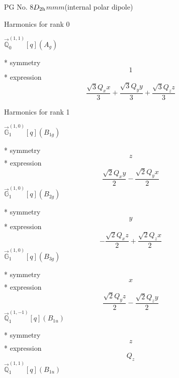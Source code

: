 \documentclass[fleqn,8pt]{jsarticle}
\begin{document}
\setcounter{MaxMatrixCols}{32}

\renewcommand{\tablename}{Table~}
\renewcommand{\figurename}{Figure~}
\begin{center}
\LARGE
PG No. 8\quad$D_{\rm 2h}$\quad$mmm$\quad[ orthorhombic ] (internal polar dipole)
\end{center}

\noindent * Harmonics for rank 0

\noindent\quad $\vec{\mathbb{Q}}_{0}^{(1,1)}[q](A_{g})$

\noindent\quad ** symmetry
\begin{dmath*}
1
\end{dmath*}
\noindent\quad ** expression
\begin{dmath*}
\frac{\sqrt{3} Q_{x} x}{3} + \frac{\sqrt{3} Q_{y} y}{3} + \frac{\sqrt{3} Q_{z} z}{3}
\end{dmath*}

\noindent * Harmonics for rank 1

\noindent\quad $\vec{\mathbb{G}}_{1}^{(1,0)}[q](B_{1g})$

\noindent\quad ** symmetry
\begin{dmath*}
z
\end{dmath*}
\noindent\quad ** expression
\begin{dmath*}
\frac{\sqrt{2} Q_{x} y}{2} - \frac{\sqrt{2} Q_{y} x}{2}
\end{dmath*}
\noindent\quad $\vec{\mathbb{G}}_{1}^{(1,0)}[q](B_{2g})$

\noindent\quad ** symmetry
\begin{dmath*}
y
\end{dmath*}
\noindent\quad ** expression
\begin{dmath*}
- \frac{\sqrt{2} Q_{x} z}{2} + \frac{\sqrt{2} Q_{z} x}{2}
\end{dmath*}
\noindent\quad $\vec{\mathbb{G}}_{1}^{(1,0)}[q](B_{3g})$

\noindent\quad ** symmetry
\begin{dmath*}
x
\end{dmath*}
\noindent\quad ** expression
\begin{dmath*}
\frac{\sqrt{2} Q_{y} z}{2} - \frac{\sqrt{2} Q_{z} y}{2}
\end{dmath*}
\noindent\quad $\vec{\mathbb{Q}}_{1}^{(1,-1)}[q](B_{1u})$

\noindent\quad ** symmetry
\begin{dmath*}
z
\end{dmath*}
\noindent\quad ** expression
\begin{dmath*}
Q_{z}
\end{dmath*}
\noindent\quad $\vec{\mathbb{Q}}_{1}^{(1,1)}[q](B_{1u})$
\end{document}
